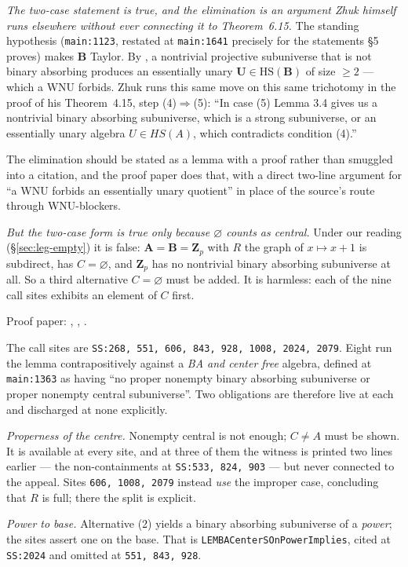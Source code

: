 \emph{The two-case statement is true, and the elimination is an argument Zhuk
himself runs elsewhere without ever connecting it to Theorem~6.15.} The
standing hypothesis (\texttt{main:1123}, restated at \texttt{main:1641}
precisely for the statements \S5 proves) makes $\mathbf B$ Taylor. By
\cite[Lem.~3.4]{ZhukStrong}, a nontrivial projective subuniverse that is not
binary absorbing produces an essentially unary $\mathbf U\in\mathrm{HS}(\mathbf
B)$ of size $\ge2$ --- which a WNU forbids. Zhuk runs this same move on this
same trichotomy in the proof of his Theorem~4.15, step (4)$\Rightarrow$(5):
``In case (5) Lemma 3.4 gives us a nontrivial binary absorbing subuniverse,
which is a strong subuniverse, or an essentially unary algebra $U\in HS(A)$,
which contradicts condition (4).''

The elimination should be stated as a lemma with a proof rather than smuggled
into a citation, and the proof paper does that, with a direct two-line argument
for ``a WNU forbids an essentially unary quotient'' in place of the source's
route through WNU-blockers.

\emph{But the two-case form is true only because $\varnothing$ counts as
central.} Under our reading (\S\ref{sec:leg-empty}) it is false:
$\mathbf A=\mathbf B=\mathbf Z_{p}$ with $R$ the graph of $x\mapsto x+1$ is
subdirect, has $C=\varnothing$, and $\mathbf Z_{p}$ has no nontrivial binary
absorbing subuniverse at all. So a third alternative $C=\varnothing$ must be
added. It is harmless: each of the nine call sites exhibits an element of $C$
first.

Proof paper: , ,
.

\begin{entry}
\label{ent:c10-sites}
The call sites are \texttt{SS:268, 551, 606, 843, 928, 1008, 2024, 2079}. Eight
run the lemma contrapositively against a \emph{BA and center free} algebra,
defined at \texttt{main:1363} as having ``no proper nonempty binary absorbing
subuniverse or proper nonempty central subuniverse''. Two obligations are
therefore live at each and discharged at none explicitly.

\emph{Properness of the centre.} Nonempty central is not enough; $C\neq A$ must
be shown. It is available at every site, and at three of them the witness is
printed two lines earlier --- the non-containments at \texttt{SS:533, 824, 903}
--- but never connected to the appeal. Sites \texttt{606, 1008, 2079} instead
\emph{use} the improper case, concluding that $R$ is full; there the split is
explicit.

\emph{Power to base.} Alternative (2) yields a binary absorbing subuniverse of
a \emph{power}; the sites assert one on the base. That is
\texttt{LEMBACenterSOnPowerImplies}, cited at \texttt{SS:2024} and omitted at
\texttt{551, 843, 928}.
\end{entry}

